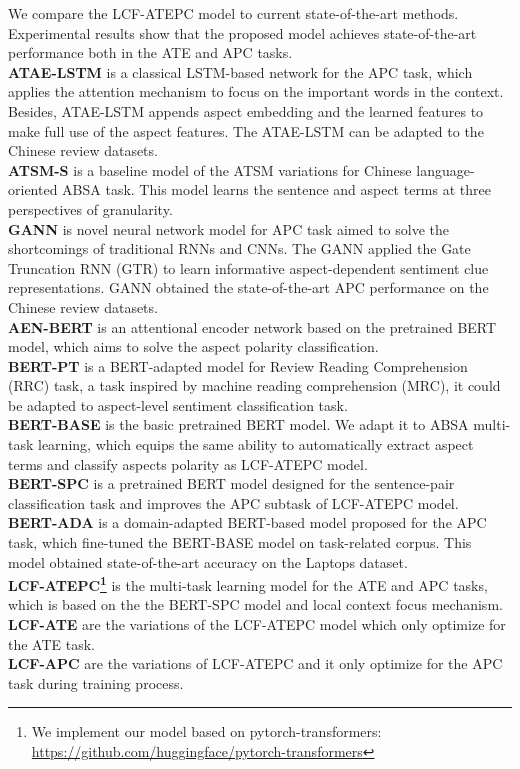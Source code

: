 \documentclass[a4paper,fleqn]{cas-sc}
\begin{document}
We compare the LCF-ATEPC model to current state-of-the-art methods. Experimental results show that the proposed model achieves state-of-the-art performance both in the ATE and APC tasks. \\
\textbf{ATAE-LSTM} \cite{wang2016attention} is a classical LSTM-based network for the APC task, which applies the attention mechanism to focus on the important words in the context. Besides, ATAE-LSTM appends aspect embedding and the learned features to make full use of the aspect features. The ATAE-LSTM can be adapted to the Chinese review datasets.\\
\textbf{ATSM-S} \cite{peng2018learning} is a baseline model of the ATSM variations for Chinese language-oriented ABSA task. This model learns the sentence and aspect terms at three perspectives of granularity. \\
\textbf{GANN} is novel neural network model for APC task aimed to solve the shortcomings of traditional RNNs and CNNs. The GANN applied the Gate Truncation RNN (GTR) to learn informative aspect-dependent sentiment clue representations. GANN obtained the state-of-the-art APC performance on the Chinese review datasets. \\
\textbf{AEN-BERT} \cite{song2019attentional} is an attentional encoder network based on the pretrained BERT model, which aims to solve the aspect polarity classification. \\
\textbf{BERT-PT} \cite{xu2019bert} is a BERT-adapted model for Review Reading Comprehension (RRC) task, a task inspired by machine reading comprehension (MRC), it could be adapted to aspect-level sentiment classification task. \\
\textbf{BERT-BASE} \cite{devlin2019bert} is the basic pretrained BERT model. We adapt it to ABSA multi-task learning, which equips the same ability to automatically extract aspect terms and classify aspects polarity as LCF-ATEPC model. \\
\textbf{BERT-SPC} \cite{song2019attentional} is a pretrained BERT model designed for the sentence-pair classification task and improves the APC subtask of LCF-ATEPC model. \\
\textbf{BERT-ADA} \cite{rietzler2019adapt} is a domain-adapted BERT-based model proposed for the APC task, which fine-tuned the BERT-BASE model on task-related corpus. This model obtained state-of-the-art accuracy on the Laptops dataset.\\
\textbf{LCF-ATEPC\footnote{We implement our model based on pytorch-transformers: \url{ https://github.com/huggingface/pytorch-transformers}}} is the multi-task learning model for the ATE and APC tasks, which is based on the the BERT-SPC model and local context focus mechanism. \\
\textbf{LCF-ATE} are the variations of the LCF-ATEPC model which only optimize for the ATE task. \\
\textbf{LCF-APC} are the variations of LCF-ATEPC and it only optimize for the APC task during training process.\\
\end{document}
